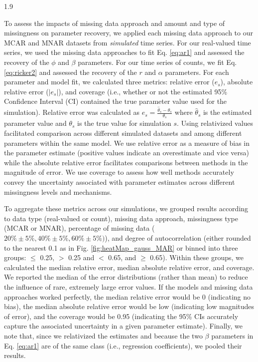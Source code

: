 \documentclass[12pt,english]{article} %
\begin{document}
\begin{linenumbers}
\begin{spacing}{1.9}
\begin{flushleft}
\hspace{1em} To assess the impacts of missing data approach and amount and type of missingness on parameter recovery, we applied each missing data approach to our MCAR and MNAR datasets from \textit{simulated} time series. For our real-valued time series, we used the missing data approaches to fit Eq. \ref{eq:ar1} and assessed the recovery of the $\phi$ and $\beta$ parameters. For our time series of counts, we fit Eq. \ref{eq:ricker2} and assessed the recovery of the $r$ and $\alpha$ parameters. For each parameter and model fit, we calculated three metrics: relative error ($e_s$), absolute relative error ($|e_s|$), and coverage (i.e., whether or not the estimated 95\% Confidence Interval (CI) contained the true parameter value used for the simulation). Relative error was calculated as $e_s = \frac{\hat{\theta}_s - \theta_s}{\theta_s}$ where $\hat \theta_s$ is the estimated parameter value and $\theta_s$ is the true value for simulation $s$. Using relativized values facilitated comparison across different simulated datasets and among different parameters within the same model. We use relative error as a measure of bias in the parameter estimate (positive values indicate an overestimate and vice versa) while the absolute relative error facilitates comparisons between methods in the magnitude of error. We use coverage to assess how well methods accurately convey the uncertainty associated with parameter estimates across different missingness levels and mechanisms.

\hspace{1em} 
To aggregate these metrics across our simulations, we grouped results according to data type (real-valued or count), missing data approach, missingness type (MCAR or MNAR), percentage of missing data ($20\% \pm 5\%, 40\% \pm 5\%, 60\% \pm 5\%)$), and degree of autocorrelation (either rounded to the nearest 0.1 as in Fig. \ref{fig:heatMap_gauss_MAR} or binned into three groups: $\leq$ 0.25, $>$ 0.25 and $<$ 0.65, and $\geq$ 0.65). Within these groups, we calculated the median relative error, median absolute relative error, and coverage. We reported the median of the error distributions (rather than mean) to reduce the influence of rare, extremely large error values. If the models and missing data approaches worked perfectly, the median relative error would be 0 (indicating no bias), the median absolute relative error would be low (indicating low magnitudes of error), and the coverage would be 0.95 (indicating the 95\% CIs accurately capture the associated uncertainty in a given parameter estimate). Finally, we note that, since we relativized the estimates and because the two $\beta$ parameters in Eq. \ref{eq:ar1} are of the same class (i.e., regression coefficients), we pooled their results.


\end{flushleft}
\end{spacing}
\end{linenumbers}
\end{document}
